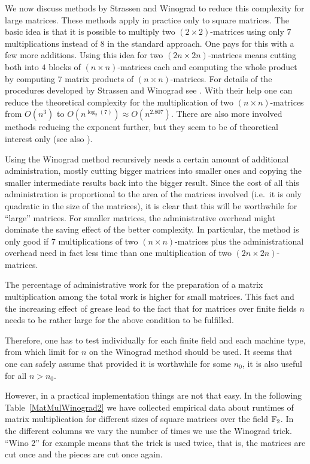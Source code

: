 We now discuss methods by Strassen and Winograd to reduce this complexity
for large matrices. These methods apply in practice only to square matrices.
The basic idea is that it is possible to multiply two $(2 \times 2)$-matrices
using only $7$ multiplications instead of $8$ in the standard approach.
One pays for this with a few more additions. Using this idea for two 
$(2n \times 2n)$-matrices means cutting both into $4$ blocks of 
$(n\times n)$-matrices each and computing the whole product by computing
$7$ matrix products of $(n \times n)$-matrices. For details of the
procedures developed by Strassen and Winograd see \cite[4.6.4]{AOCP2}.
With their help one can reduce the theoretical complexity for the 
multiplication of two $(n \times n)$-matrices from $O(n^3)$
to $O(n^{\log_2(7)}) \approx O(n^{2.807})$. 
There are also more involved methods reducing the exponent
further, but they seem to be of theoretical interest only (see 
also \cite[4.6.4]{AOCP2}).

Using the Winograd method recursively needs a certain amount of
additional administration, mostly cutting bigger matrices into smaller
ones and copying the smaller intermediate results back into the
bigger result. Since the cost of all this administration is proportional
to the area of the matrices involved (i.e.~it is only quadratic in the
size of the matrices), it is clear that this will be worthwhile for 
``large'' matrices. For smaller matrices, the administrative overhead
might dominate the saving effect of the better complexity.
In particular, the method is only good if $7$ multiplications of two $(n
\times n)$-matrices plus the administrational overhead need in fact less
time than one multiplication of two $(2n \times 2n)$-matrices.

The percentage of administrative work for the preparation of a matrix
multiplication among the total work is higher for small matrices.
This fact and the increasing effect of grease lead to the
fact that for matrices over finite fields $n$ needs to be rather large
for the above condition to be fulfilled. 

Therefore, one has to test individually for each finite field and each
machine type, from which limit for $n$ on the Winograd method should
be used. It seems that one can safely assume that provided it is 
worthwhile for some $n_0$, it is also useful for all $n > n_0$. 

However, in a practical implementation things are not that easy. In
the following Table~\ref{MatMulWinograd2} we have collected empirical
data about runtimes of matrix multiplication for different sizes of
square matrices over the field $\mathbb{F}_2$. In the different columns we vary
the number of times we use the Winograd trick. ``Wino 2'' for example
means that the trick is used twice, that is, the matrices are cut once
and the pieces are cut once again.

